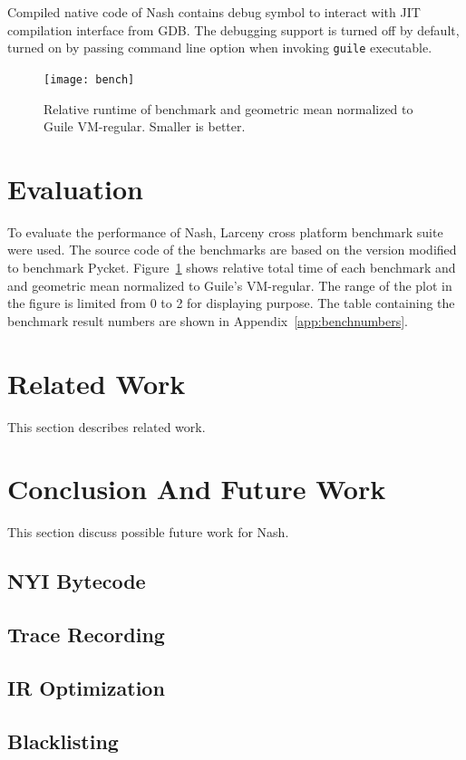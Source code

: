 \documentclass[preprint, numbers]{sigplanconf}
\begin{document}
Compiled native code of Nash contains debug symbol to interact with JIT
compilation interface from GDB\cite{gdbdebugger}. The debugging support is
turned off by default, turned on by passing command line option when invoking
\texttt{guile} executable.

\begin{figure}
  \centering
  \texttt{[image: bench]}
  \caption{Relative runtime of benchmark and geometric mean normalized to
    Guile VM-regular. Smaller is better.}
  \label{fig:bench}
\end{figure}

\section{Evaluation}
\label{sec:evaluation}
To evaluate the performance of Nash, Larceny cross platform benchmark suite
were used. The source code of the benchmarks are based on the version modified
to benchmark Pycket. Figure~\ref{fig:bench} shows relative total time of each
benchmark and and geometric mean normalized to Guile's VM-regular. The range
of the plot in the figure is limited from 0 to 2 for displaying purpose. The
table containing the benchmark result numbers are shown in
Appendix~\ref{app:benchnumbers}.

\section{Related Work}
\label{sec:related}
This section describes related work.

\section{Conclusion And Future Work}
\label{sec:conclusion}
This section discuss possible future work for Nash.

\subsection{NYI Bytecode}
\subsection{Trace Recording}
\subsection{IR Optimization}
\subsection{Blacklisting}
\end{document}

